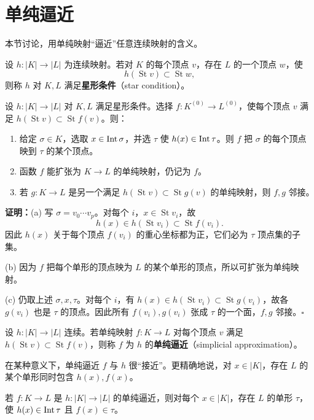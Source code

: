 \section{单纯逼近}
本节讨论，用单纯映射“逼近”任意连续映射的含义。

设 $h:|K|\to|L|$ 为连续映射。若对 $K$ 的每个顶点 $v$，存在 $L$ 的一个顶点 $w$，使
\[
h(\operatorname{St}v)\subset\operatorname{St}w,
\]
则称 $h$ 对 $K,L$ 满足\textbf{星形条件}（star condition）。

设 $h:|K|\to|L|$ 对 $K,L$ 满足星形条件。选择 $f:K^{(0)}\to L^{(0)}$，使每个顶点 $v$ 满足 $h(\operatorname{St}v)\subset\operatorname{St}f(v)$。则：
\begin{enumerate}[label=(\alph*)]
\item 给定 $\sigma\in K$，选取 $x\in\operatorname{Int}\sigma$，并选 $\tau$ 使 $h(x)\in\operatorname{Int}\tau$。则 $f$ 把 $\sigma$ 的每个顶点映到 $\tau$ 的某个顶点。
\item 函数 $f$ 能扩张为 $K\to L$ 的单纯映射，仍记为 $f$。
\item 若 $g:K\to L$ 是另一个满足 $h(\operatorname{St}v)\subset\operatorname{St}g(v)$ 的单纯映射，则 $f,g$ 邻接。
\end{enumerate}
\noindent\textbf{证明：}(a) 写 $\sigma=v_0\cdots v_p$。对每个 $i$，$x\in\operatorname{St}v_i$，故
\[
h(x)\in h(\operatorname{St}v_i)\subset\operatorname{St}f(v_i).
\]
因此 $h(x)$ 关于每个顶点 $f(v_i)$ 的重心坐标都为正，它们必为 $\tau$ 顶点集的子集。

(b) 因为 $f$ 把每个单形的顶点映为 $L$ 的某个单形的顶点，所以可扩张为单纯映射。

(c) 仍取上述 $\sigma,x,\tau$。对每个 $i$，有 $h(x)\in h(\operatorname{St}v_i)\subset\operatorname{St}g(v_i)$，故各 $g(v_i)$ 也是 $\tau$ 的顶点。因此所有 $f(v_i),g(v_i)$ 张成 $\tau$ 的一个面，$f,g$ 邻接。\hfill$\square$

设 $h:|K|\to|L|$ 连续。若单纯映射 $f:K\to L$ 对每个顶点 $v$ 满足 $h(\operatorname{St}v)\subset\operatorname{St}f(v)$，则称 $f$ 为 $h$ 的\textbf{单纯逼近}（simplicial approximation）。

在某种意义下，单纯逼近 $f$ 与 $h$ 很“接近”。更精确地说，对 $x\in|K|$，存在 $L$ 的某个单形同时包含 $h(x),f(x)$。

若 $f:K\to L$ 是 $h:|K|\to|L|$ 的单纯逼近，则对每个 $x\in|K|$，存在 $L$ 的单形 $\tau$，使 $h(x)\in\operatorname{Int}\tau$ 且 $f(x)\in\tau$。

